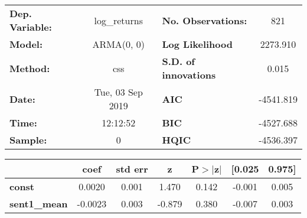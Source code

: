 \begin{center}
\begin{tabular}{lclc}
\toprule
\textbf{Dep. Variable:} &   log\_returns   & \textbf{  No. Observations:  } &    821      \\
\textbf{Model:}         &    ARMA(0, 0)    & \textbf{  Log Likelihood     } &  2273.910   \\
\textbf{Method:}        &       css        & \textbf{  S.D. of innovations} &   0.015     \\
\textbf{Date:}          & Tue, 03 Sep 2019 & \textbf{  AIC                } & -4541.819   \\
\textbf{Time:}          &     12:12:52     & \textbf{  BIC                } & -4527.688   \\
\textbf{Sample:}        &        0         & \textbf{  HQIC               } & -4536.397   \\
\bottomrule
\end{tabular}
\begin{tabular}{lcccccc}
                     & \textbf{coef} & \textbf{std err} & \textbf{z} & \textbf{P$> |$z$|$} & \textbf{[0.025} & \textbf{0.975]}  \\
\midrule
\textbf{const}       &       0.0020  &        0.001     &     1.470  &         0.142        &       -0.001    &        0.005     \\
\textbf{sent1\_mean} &      -0.0023  &        0.003     &    -0.879  &         0.380        &       -0.007    &        0.003     \\
\bottomrule
\end{tabular}
\end{center}
